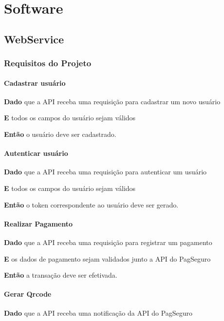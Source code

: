 \chapter[Software]{Software}

\section[WebService]{WebService}

\subsection{Requisitos do Projeto}

\subsubsection{Cadastrar usuário}

\textbf{Dado} que a API receba uma requisição para cadastrar um novo usuário

\textbf{E} todos os campos do usuário sejam válidos

\textbf{Então} o usuário deve ser cadastrado.

\subsubsection{Autenticar usuário}

\textbf{Dado} que a API receba uma requisição para autenticar um usuário

\textbf{E} todos os campos do usuário sejam válidos

\textbf{Então} o token correspondente ao usuário deve ser gerado.

\subsubsection{Realizar Pagamento}

\textbf{Dado} que a API receba uma requisição para registrar um pagamento

\textbf{E} os dados de pagamento sejam validados junto a API do PagSeguro

\textbf{Então} a transação deve ser efetivada.

\subsubsection{Gerar Qrcode}

\textbf{Dado} que a API receba uma notificação da API do PagSeguro

